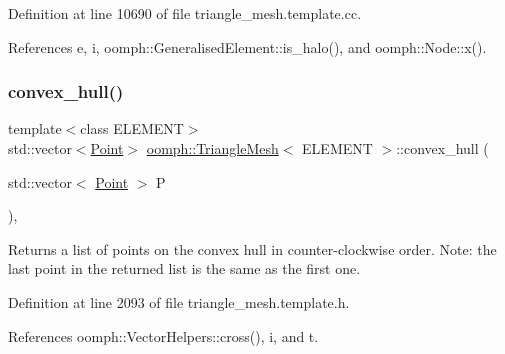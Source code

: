 Definition at line 10690 of file triangle\+\_\+mesh.\+template.\+cc.



References e, i, oomph\+::\+Generalised\+Element\+::is\+\_\+halo(), and oomph\+::\+Node\+::x().

\mbox{\label{classoomph_1_1TriangleMesh_a97228c6d359e1e58efb45dcba1386969}} 
\subsubsection{\texorpdfstring{convex\+\_\+hull()}{convex\_hull()}}
{\footnotesize\ttfamily template$<$class E\+L\+E\+M\+E\+NT$>$ \\
std\+::vector$<$\hyperlink{structoomph_1_1TriangleMesh_1_1Point}{Point}$>$ \hyperlink{classoomph_1_1TriangleMesh}{oomph\+::\+Triangle\+Mesh}$<$ E\+L\+E\+M\+E\+NT $>$\+::convex\+\_\+hull (\begin{DoxyParamCaption}\item[{std\+::vector$<$ \hyperlink{structoomph_1_1TriangleMesh_1_1Point}{Point} $>$}]{P }\end{DoxyParamCaption})\hspace{0.3cm}{\ttfamily [inline]}, {\ttfamily [private]}}



Returns a list of points on the convex hull in counter-\/clockwise order. Note\+: the last point in the returned list is the same as the first one. 



Definition at line 2093 of file triangle\+\_\+mesh.\+template.\+h.



References oomph\+::\+Vector\+Helpers\+::cross(), i, and t.

\mbox{\label{classoomph_1_1TriangleMesh_a36fcc3de82185868d8adb95c73568315}} 
